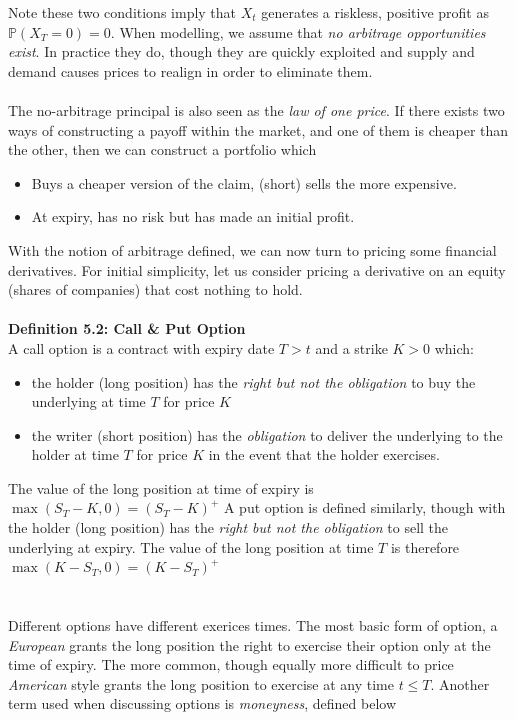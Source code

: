 \documentclass{article}
\begin{document}
Note these two conditions imply that $X_t$ generates a riskless, positive profit as $\mathbb{P}(X_T =0)=0$. When modelling, we assume that \textit{no arbitrage opportunities exist}. In practice they do, though they are quickly exploited and supply and demand causes prices to realign in order to eliminate them. \\
\\
The no-arbitrage principal is also seen as the \textit{law of one price}. If there exists two ways of constructing a payoff within the market, and one of them is cheaper than the other, then we can construct a portfolio which
\begin{itemize}
    \item Buys a cheaper version of the claim, (short) sells the more expensive. 
    \item At expiry, has no risk but has made an initial profit.
\end{itemize}
With the notion of arbitrage defined, we can now turn to pricing some financial derivatives. For initial simplicity, let us consider pricing a derivative on an equity (shares of companies) that cost nothing to hold. \\
\\
\textbf{Definition 5.2: Call \& Put Option}\\
A call option is a contract with expiry date $T>t$ and a strike $K>0$ which: \begin{itemize}
    \item the holder (long position) has the \textit{right but not the obligation} to buy the underlying at time $T$ for price $K$ 
    \item the writer (short position) has the \textit{obligation} to deliver the underlying to the holder at time $T$ for price $K$ in the event that the holder exercises. 
\end{itemize}
The value of the long position at time of expiry is 
$\max(S_T-K, 0) = (S_T-K)^+$
A put option is defined similarly, though with the holder (long position) has the \textit{right but not the obligation} to sell the underlying at expiry. The value of the long position at time $T$ is therefore
$\max(K-S_T, 0) = (K-S_T)^+$ \\
\\
\\
Different options have different exerices times. The most basic form of option, a \textit{European} grants the long position the right to exercise their option only at the time of expiry. The more common, though equally more difficult to price \textit{American} style grants the long position to exercise at any time $t\leq T$. Another term used when discussing options is \textit{moneyness}, defined below \\
\end{document}
